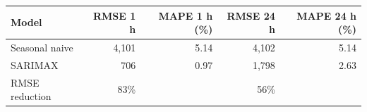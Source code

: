 \begin{tabular}{lrrrr}
\toprule
Model & RMSE 1 h & MAPE 1 h (\%) & RMSE 24 h & MAPE 24 h (\%) \\
\midrule
Seasonal naive & 4,101 & 5.14 & 4,102 & 5.14 \\
SARIMAX & 706 & 0.97 & 1,798 & 2.63 \\
RMSE reduction & 83\% &  & 56\% &  \\
\bottomrule
\end{tabular}
